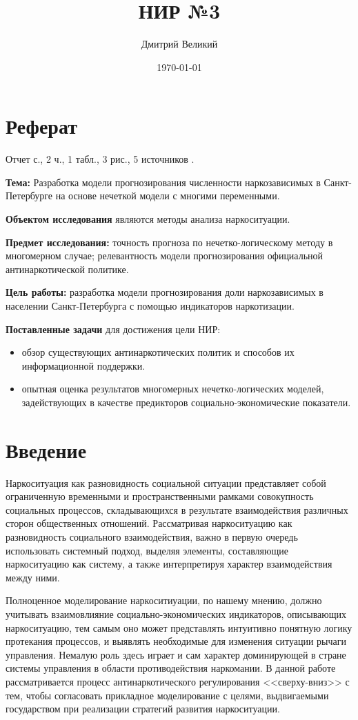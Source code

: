 \documentclass[a4paper,14pt]{article}
\author{Дмитрий Великий}
\title{НИР №3}
\date{\today}
\begin{document}


\tableofcontents

\newpage
\section*{\centering Реферат}
Отчет \pageref{LastPage} с., 2 ч., 1 табл., 3 рис., 5 источников .

\textbf{Тема:} Разработка модели прогнозирования численности наркозависимых в Санкт-Петербурге на основе нечеткой модели с многими переменными.

\textbf{Объектом исследования} являются методы анализа наркоситуации.

\textbf{Предмет исследования:} точность прогноза по нечетко-логическому методу в многомерном случае; релевантность модели прогнозирования официальной антинаркотической политике.

\textbf{Цель работы:} разработка модели прогнозирования доли наркозависимых в населении Санкт-Петербурга с помощью индикаторов наркотизации.

\textbf{Поставленные задачи} для достижения цели НИР:
\begin{itemize}
	\item обзор существующих антинаркотических политик и способов их информационной поддержки.
	\item опытная оценка результатов многомерных нечетко-логических моделей, задействующих в качестве предикторов социально-экономические показатели.
\end{itemize} 

\newpage
\section*{Введение}

Наркоситуация как разновидность социальной ситуации представляет собой ограниченную временными и пространственными рамками совокупность социальных процессов, складывающихся в результате взаимодействия различных
сторон общественных отношений. Рассматривая наркоситуацию как разновидность социального взаимодействия, важно в первую очередь использовать системный подход, выделяя
элементы, составляющие наркоситуацию как систему, а также интерпретируя характер взаимодействия между ними.

Полноценное моделирование наркоситиуации, по нашему мнению, должно учитывать взаимовлияние социально-экономических индикаторов, описывающих наркоситуацию, тем самым оно может представлять интуитивно понятную логику протекания процессов, и выявлять необходимые для изменения ситуации рычаги управления. Немалую роль здесь играет и сам характер доминирующей в стране системы управления в области противодействия наркомании. В данной работе 
рассматривается процесс антинаркотического регулирования <<сверху-вниз>> с тем, чтобы согласовать прикладное моделирование с целями, выдвигаемыми государством при реализации стратегий развития наркоситуации.
\end{document}
